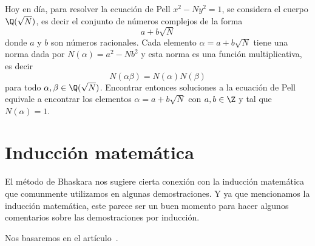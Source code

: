 Hoy en día, para resolver la ecuación de Pell $x^2-Ny^2=1$, se considera
el cuerpo $\Q(\sqrt{N})$, es decir el conjunto
de números complejos de la forma
\[
	a+b\sqrt{N}
\]
donde $a$ y $b$ son números racionales. Cada elemento $\alpha=a+b\sqrt{N}$
tiene una norma dada por $N(\alpha)=a^2-Nb^2$ y esta norma es una función
multiplicativa, es decir
\[
	N(\alpha\beta)=N(\alpha)N(\beta)
\]
para todo $\alpha,\beta\in\Q(\sqrt{N})$. Encontrar entonces soluciones a la
ecuación de Pell equivale a encontrar los elementos $\alpha=a+b\sqrt{N}$ con
$a,b\in\Z$ y tal que $N(\alpha)=1$. 


\section*{Inducción matemática}

El método de Bhaskara nos sugiere cierta conexión con la inducción matemática
que comunmente utilizamos en algunas demostraciones.  Y ya que mencionamos la
inducción matemática, este parece ser un buen momento para hacer algunos
comentarios sobre las demostraciones por inducción. 

Nos basaremos en el
artículo~\cite{MR1519060}. 

